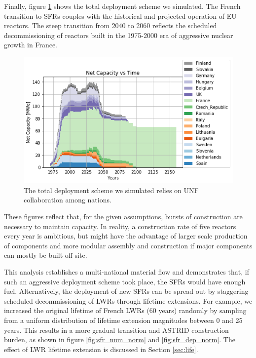 Finally, figure \ref{fig:tot_dep} shows the total deployment scheme we simulated.  
The French transition to \glspl{SFR} couples with the historical and projected 
operation of \gls{EU} reactors.  The steep transition from 2040 to 2060 
reflects the scheduled decommissioning of reactors built in the 1975-2000 era 
of aggressive nuclear growth in France.

\begin{figure}[htbp!]
    \begin{center}
        \includegraphics[scale=0.6]{./images/eu_future/onesim.png}
    \end{center}
    \caption{The total deployment scheme we simulated relies on \gls{UNF} 
    collaboration among nations.} 
    \label{fig:tot_dep}
\end{figure}

These figures reflect that, for the given assumptions, bursts of construction
are necessary to maintain capacity.  In reality, a construction rate of five 
reactors every year is ambitious, but might have the advantage of
larger scale production of components and more modular assembly and construction if major components can mostly be built off site.

This analysis establishes a multi-national material flow and demonstrates that, if such an aggressive deployment scheme 
took place, the \glspl{SFR} would have enough fuel.  Alternatively, the 
deployment of new \glspl{SFR} can be spread out by staggering scheduled 
decommissioning of \glspl{LWR} through lifetime extensions. For example,
we increased the original lifetime of French \glspl{LWR} (60 years) randomly 
by sampling from a uniform distribution of lifetime extension
magnitudes between 0 and 25 years. 
This results in a more gradual transition and \gls{ASTRID} construction
burden, as shown in figure \ref{fig:sfr_num_norm} and \ref{fig:sfr_dep_norm}.
The effect of \gls{LWR} lifetime extension is discussed in Section \ref{sec:life}.


